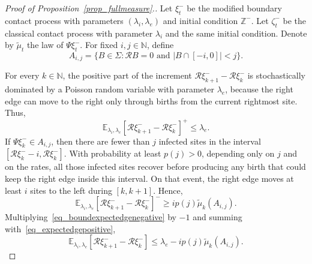 \documentclass[11pt,a4paper]{article}
\theoremstyle{plain}
\theoremstyle{definition}
\theoremstyle{remark}
\numberwithin{equation}{section}
\begin{document}
	\begin{proof}[{Proof of Proposition~\ref{prop_fullmeasure}}.]
	Let $\xi^-_t$ be the modified boundary contact process with parameters $(\lambda_i,\lambda_e)$ and initial condition $\mathbb{Z}^-$. Let $\zeta^-_t$ be the classical contact process with parameter $\lambda_i$ and the same initial condition. Denote by $\tilde{\mu}_t$ the law of $\Psi\xi^-_t$. For fixed $i,j\in\mathbb{N}$, define
		\[
		A_{i,j}=\{B\in\Sigma:\mathcal{R}B=0 \text{ and } |B\cap[-i,0]|<j\}.
		\]
	
	For every $k\in\mathbb{N}$, the positive part of the increment $\mathcal{R}\xi^-_{k+1}-\mathcal{R}\xi^-_k$ is stochastically dominated by a Poisson random variable with parameter $\lambda_e$, because the right edge can move to the right only through births from the current rightmost site. Thus,
		\begin{equation} \label{eq_expectedgepositive}
			\mathbb{E}_{\lambda_i,\lambda_e}[\mathcal{R}\xi^{-}_{k+1}-\mathcal{R}\xi^{-}_{k}]^{+} \le \lambda_e.
		\end{equation}
	If $\Psi\xi^-_k\in A_{i,j}$, then there are fewer than $j$ infected sites in the interval $[\mathcal{R}\xi^-_k-i,\mathcal{R}\xi^-_k]$. With probability at least $p(j)>0$, depending only on $j$ and on the rates, all those infected sites recover before producing any birth that could keep the right edge inside this interval. On that event, the right edge moves at least $i$ sites to the left during $[k,k+1]$. Hence,
		\begin{equation} \label{eq_boundexpectedgenegative}
			\mathbb{E}_{\lambda_i,\lambda_e}[\mathcal{R}\xi^{-}_{k+1}-\mathcal{R}\xi^{-}_{k}]^{-} \ge ip(j)\tilde{\mu}_k(A_{i,j}).
		\end{equation}
	Multiplying~\eqref{eq_boundexpectedgenegative} by $-1$ and summing with~\eqref{eq_expectedgepositive},
		\begin{equation} \label{eq_boundexpecedge}
			\mathbb{E}_{\lambda_i,\lambda_e}[\mathcal{R}\xi^{-}_{k+1}-\mathcal{R}\xi^{-}_{k}] \le \lambda_e-ip(j)\tilde{\mu}_k(A_{i,j}).
		\end{equation}
	

\end{proof}
\end{document}
